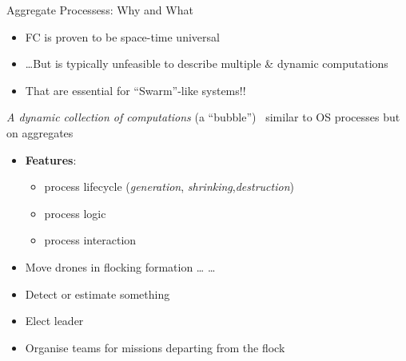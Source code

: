 \documentclass[8pt, aspectratio=169, handout]{beamer}
\begin{document}
\begin{frame}[allowframebreaks]{Aggregate Processess: Why and What}
  \begin{card}[Why?]
    \begin{itemize}
      \item FC is proven to be space-time universal
      \item \dots But is typically unfeasible to describe multiple \& dynamic computations
      \item[\faArrowRight] That are essential for ``Swarm''-like systems!! 
    \end{itemize}
  \end{card}
  \begin{card}
    \emph{A dynamic collection of computations} (a ``bubble'') \faArrowRight \, similar to OS processes but on aggregates
    \begin{itemize}
      \item \textbf{Features}:
      \begin{itemize}
        \item process lifecycle (\emph{generation}, \emph{shrinking},\emph{destruction})
        \item process logic
        \item process interaction
      \end{itemize}
    \end{itemize}
  \end{card}
  \begin{card}
    \begin{itemize}
      \item Move drones in flocking formation \dots {} \dots
      \item Detect or estimate something
      \item Elect leader
      \item Organise teams for missions departing from the flock
    \end{itemize}
  \end{card}
  \centering
  \begin{multicols*}{3}
  \end{multicols*}
\end{frame}
\end{document}
